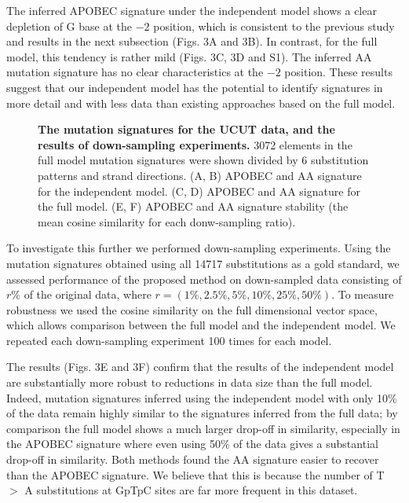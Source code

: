\documentclass[10pt,letterpaper]{article}
\begin{document}
The inferred APOBEC signature under the independent model
shows a clear depletion of G base at the $-2$ position,
which is consistent to the previous study \cite{pmid23318258} and results in the next subsection (Figs. 3A and 3B).
In contrast, for the full model, this tendency is rather mild (Figs. 3C, 3D and S1).
The inferred AA mutation signature has no clear characteristics at the $-2$ position.
These results suggest that our independent model has the potential
to identify signatures in more detail and with less data than existing approaches based on the full model.

\begin{figure}[h]
\caption{{\bf The mutation signatures for the UCUT data, and the results of down-sampling experiments.}
3072 elements in the full model mutation signatures were shown divided by 6 substitution patterns and strand directions.
(A, B) APOBEC and AA signature for the independent model.
(C, D) APOBEC and AA signature for the full model.
(E, F) APOBEC and AA signature stability (the mean cosine similarity for each donw-sampling ratio).}
\label{UCUT}
\end{figure}

To investigate this further we performed down-sampling experiments.
Using the mutation signatures obtained using all 14717 substitutions as a gold standard, 
we assessed performance of the proposed method on down-sampled data consisting of $r\%$ of the original data, where  $r=(1\%, 2.5\%, 5\%, 10\%, 25\%, 50\%)$.
To measure robustness we used the cosine similarity on the 
full dimensional vector space, which allows comparison between the full model and the independent model.
We repeated each down-sampling experiment 100 times for each model.


The results (Figs. 3E and 3F)
confirm that the results of the independent model 
are substantially more robust to reductions in data size than the full model. Indeed, mutation signatures inferred using the independent model with only 10\% of the data 
remain highly similar to the signatures inferred from the full data; by comparison the full model shows a much larger drop-off in similarity, especially in the APOBEC signature where even using 50\% of the data gives a substantial drop-off in similarity. Both methods found the AA signature 
easier to recover than the APOBEC signature.
We believe that this is because the number of T $>$ A substitutions at GpTpC sites are far more frequent in this dataset.
\end{document}
